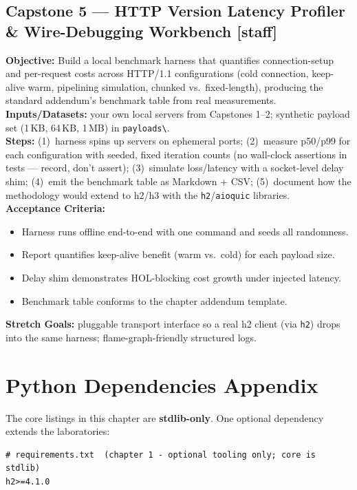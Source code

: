 \subsection{Capstone 5 --- HTTP Version Latency Profiler \& Wire-Debugging Workbench [staff]}
\textbf{Objective:} Build a local benchmark harness that quantifies connection-setup and per-request costs across HTTP/1.1 configurations (cold connection, keep-alive warm, pipelining simulation, chunked vs.\ fixed-length), producing the standard addendum's benchmark table from real measurements.\\
\textbf{Inputs/Datasets:} your own local servers from Capstones 1--2; synthetic payload set (1\,KB, 64\,KB, 1\,MB) in \texttt{payloads\textbackslash}.\\
\textbf{Steps:} (1)~harness spins up servers on ephemeral ports; (2)~measure p50/p99 for each configuration with seeded, fixed iteration counts (no wall-clock assertions in tests --- record, don't assert); (3)~simulate loss/latency with a socket-level delay shim; (4)~emit the benchmark table as Markdown + CSV; (5)~document how the methodology would extend to h2/h3 with the \texttt{h2}/\texttt{aioquic} libraries.\\
\textbf{Acceptance Criteria:}
\begin{itemize}
  \item[$\square$] Harness runs offline end-to-end with one command and seeds all randomness.
  \item[$\square$] Report quantifies keep-alive benefit (warm vs.\ cold) for each payload size.
  \item[$\square$] Delay shim demonstrates HOL-blocking cost growth under injected latency.
  \item[$\square$] Benchmark table conforms to the chapter addendum template.
\end{itemize}
\textbf{Stretch Goals:} pluggable transport interface so a real h2 client (via \texttt{h2}) drops into the same harness; flame-graph-friendly structured logs.

\section{Python Dependencies Appendix}

The core listings in this chapter are \textbf{stdlib-only}. One optional dependency extends the laboratories:

\begin{verbatim}
# requirements.txt  (chapter 1 - optional tooling only; core is stdlib)
h2>=4.1.0
\end{verbatim}

